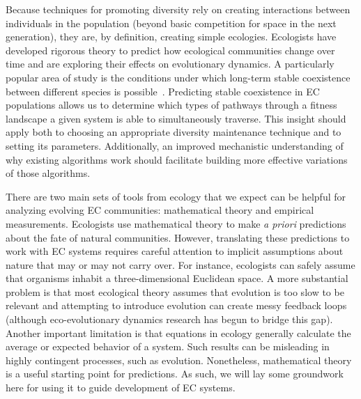 Because techniques for promoting diversity rely on creating interactions between individuals in the population (beyond basic competition for space in the next generation), they are, by definition, creating simple ecologies. Ecologists have developed rigorous theory to predict how ecological communities change over time and are exploring their effects on evolutionary dynamics.
A particularly popular area of study is the conditions under which long-term stable coexistence between different species is possible~\cite{pacala_limiting_1994, chesson_mechanisms_2000,chase_ecological_2003,letten_linking_2017}. Predicting stable coexistence in EC populations allows us to determine which types of pathways through a fitness landscape a given system is able to simultaneously traverse. %
This insight should apply both to choosing an appropriate diversity maintenance technique and to setting its parameters.
Additionally, an improved mechanistic understanding of why existing algorithms work should facilitate building more effective variations of those algorithms.

There are two main sets of tools from ecology that we expect can be helpful for analyzing evolving EC communities: mathematical theory and empirical measurements.
Ecologists use mathematical theory to make \textit{a priori} predictions about the fate of natural communities.  However, translating these predictions to work with EC systems requires careful attention to implicit assumptions about nature that may or may not carry over. For instance, ecologists can safely assume that organisms inhabit a three-dimensional Euclidean space.
A more substantial problem is that most ecological theory assumes that
evolution is too slow
to be relevant and attempting to introduce evolution can create messy feedback loops (although eco-evolutionary dynamics research has begun to bridge this gap).
Another important limitation is that equations in ecology generally calculate the average or expected behavior of a system. Such results can be misleading in highly contingent processes, such as evolution.
Nonetheless, mathematical theory is a useful starting point for predictions. As such, we will lay some groundwork here for using it to guide development of EC systems.

